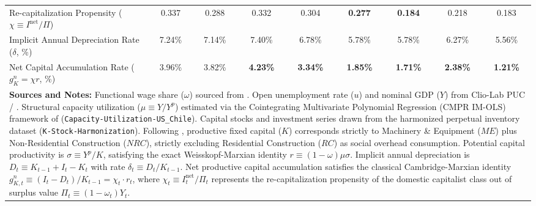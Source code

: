 \begin{table}[htbp]
{\begin{tabular}{lcccccccc}
Re-capitalization Propensity ($\chi \equiv I^{\text{net}}/\Pi$) & 0.337 & 0.288 & 0.332 & 0.304 & \textbf{0.277} & \textbf{0.184} & 0.218 & 0.183 \\
Implicit Annual Depreciation Rate ($\delta$, \%) & 7.24\% & 7.14\% & 7.40\% & 6.78\% & 5.78\% & 5.78\% & 6.27\% & 5.56\% \\
Net Capital Accumulation Rate ($g^n_K = \chi r$, \%) & 3.96\% & 3.82\% & \textbf{4.23\%} & \textbf{3.34\%} & \textbf{1.85\%} & \textbf{1.71\%} & \textbf{2.38\%} & \textbf{1.21\%} \\
\bottomrule
\multicolumn{9}{p{17.2cm}}{\footnotesize \textbf{Sources and Notes:} Functional wage share ($\omega$) sourced from \citet{Astorga2023}. Open unemployment rate ($u$) and nominal GDP ($Y$) from Clio-Lab PUC / \citet{DiazLudersWagner2016}. Structural capacity utilization ($\mu \equiv Y/Y^p$) estimated via the Cointegrating Multivariate Polynomial Regression (CMPR IM-OLS) framework of \citet{Polanco2026} (\texttt{Capacity-Utilization-US\_Chile}). Capital stocks and investment series drawn from the harmonized perpetual inventory dataset (\texttt{K-Stock-Harmonization}). Following \citet{Polanco2026}, productive fixed capital ($K$) corresponds strictly to Machinery \& Equipment ($ME$) plus Non-Residential Construction ($NRC$), strictly excluding Residential Construction ($RC$) as social overhead consumption. Potential capital productivity is $\sigma \equiv Y^p / K$, satisfying the exact Weisskopf-Marxian identity $r \equiv (1 - \omega) \mu \sigma$. Implicit annual depreciation is $D_t \equiv K_{t-1} + I_t - K_t$ with rate $\delta_t \equiv D_t / K_{t-1}$. Net productive capital accumulation satisfies the classical Cambridge-Marxian identity $g^n_{K, t} \equiv (I_t - D_t) / K_{t-1} = \chi_t \cdot r_t$, where $\chi_t \equiv I^{\text{net}}_t / \Pi_t$ represents the re-capitalization propensity of the domestic capitalist class out of surplus value $\Pi_t \equiv (1 - \omega_t) Y_t$.}
\end{tabular}%
}
\end{table}

